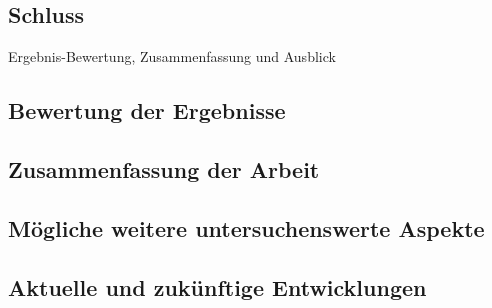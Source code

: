 \begin{spacing}{1.2}

\chapter{Schluss}
\label{sec:schluss}
Ergebnis-Bewertung, Zusammenfassung und Ausblick

\section{Bewertung der Ergebnisse}

\section{Zusammenfassung der Arbeit}

\section{Mögliche weitere untersuchenswerte Aspekte}

\section{Aktuelle und zukünftige Entwicklungen}

\end{spacing}
